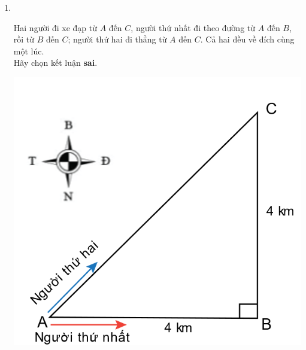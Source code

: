 \begin{enumerate}[label=\bfseries Câu \arabic*:,leftmargin=1.5cm]
\item {}\\
{\begin{minipage}[l]{0.65\textwidth}
		Hai người đi xe đạp từ $A$ đến $C$, người thứ nhất đi theo đường từ $A$ đến $B$, rồi từ $B$ đến $C$; người thứ hai đi thẳng từ $A$ đến $C$. Cả hai đều về đích cùng một lúc.\\
		Hãy chọn kết luận \textbf{sai}.
	\end{minipage}
\begin{minipage}{0.35\textwidth}
	\begin{center}
		\includegraphics[width=0.7\linewidth]{../figs/VN10-2022-PH-TP004-P-3}
	\end{center}
\end{minipage}

}


\end{enumerate}
